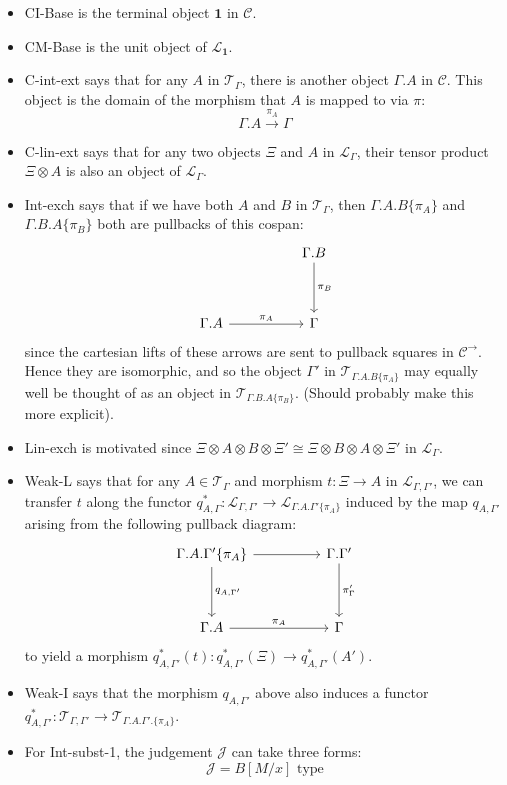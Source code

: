 \begin{itemize}
\item CI-Base is the terminal object $\mathbf{1}$ in $\mathcal{C}$.
\item CM-Base is the unit object of $\mathcal{L}_{\mathbf{1}}$.
\item C-int-ext says that for any $A$ in $\mathcal{T}_{\Gamma}$, there is another object $\Gamma.A$ in $\mathcal{C}$. This object is the domain of the morphism that $A$ is mapped to via $\pi$:
\[\Gamma.A \xrightarrow {\pi_A} \Gamma\]
\item C-lin-ext says that for any two objects $\Xi$ and $A$ in $\mathcal{L}_{\Gamma}$, their tensor product $\Xi \otimes A$ is also an object of $\mathcal{L}_{\Gamma}$.
\item Int-exch says that if we have both $A$ and $B$ in $\mathcal{T}_{\Gamma}$, then $\Gamma.A.B\{\pi_A\}$ and $\Gamma.B.A\{\pi_B\}$ both are pullbacks of this cospan:
\[
\ti
& \Gamma.B \ar[d, "\pi_B"]\\
\Gamma.A \ar[r, "\pi_A"] & \Gamma
\kz
\]
since the cartesian lifts of these arrows are sent to pullback squares in $\mathcal{C}^\to$. Hence they are isomorphic, and so the object $\Gamma'$ in $\mathcal{T}_{\Gamma.A.B\{\pi_A\}}$ may equally well be thought of as an object in $\mathcal{T}_{\Gamma.B.A\{\pi_B\}}$. (Should probably make this more explicit).
\item Lin-exch is motivated since $\Xi \otimes A \otimes B \otimes \Xi' \cong \Xi \otimes B \otimes A \otimes \Xi'$ in $\mathcal{L}_{\Gamma}$.
\item Weak-L says that for any $A \in \mathcal{T}_{\Gamma}$ and morphism $t : \Xi \to A$ in $\mathcal{L}_{\Gamma, \Gamma'}$, we can transfer $t$ along the functor $q_{A, \Gamma}^* : \mathcal{L}_{\Gamma, \Gamma'} \to \mathcal{L}_{\Gamma.A.\Gamma'\{\pi_A\}}$ induced by the map $q_{A, \Gamma'}$ arising from the following pullback diagram:
\[
\ti
\Gamma.A.\Gamma'\{\pi_A\} \ar[r] \ar[d, "q_{A, \Gamma'}"]  & \Gamma.\Gamma' \ar[d, "\pi_\Gamma'"]\\
\Gamma.A \ar[r, "\pi_A"] & \Gamma
\kz
\]
to yield a morphism $q_{A, \Gamma'}^*(t) : q_{A, \Gamma'}^*(\Xi) \to q_{A, \Gamma'}^*(A')$.
\item Weak-I says that the morphism $q_{A, \Gamma'}$ above also induces a functor $q_{A, \Gamma'}^* : \mathcal{T}_{\Gamma, \Gamma'} \to \mathcal{T}_{\Gamma.A.\Gamma'.\{\pi_A\}}$.
\item For Int-subst-1, the judgement $\mathcal{J}$ can take three forms:
\[
\mathcal{J} = B[M/x] \text{ type}
\]
\end{itemize}
